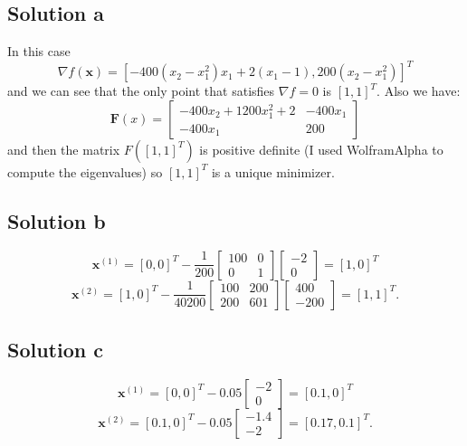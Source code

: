 \documentclass{article}
\newcommand{\bld}[1]{\boldsymbol{#1}}
\begin{document}
\subsection*{Solution a}
In this case
\[
	\nabla f(\bld{x})=[-400(x_2-x_1^2)x_1+2(x_1-1),200(x_2-x_1^2)]^T
\]
and we can see that the only point that satisfies $\nabla f=0$ is $[1,1]^T$.
Also we have:
\[
	\bld{F}(x)=\begin{bmatrix}
		-400x_2 + 1200x_1^2 + 2 & -400x_1 \\
		-400x_1 & 200
	\end{bmatrix}
\]
and then the matrix $F([1,1]^T)$ is positive definite (I used WolframAlpha to
compute the eigenvalues) so $[1,1]^T$ is a unique minimizer.
\subsection*{Solution b}
\[
	\bld{x}^{(1)}=[0,0]^T - \frac{1}{200}
	\begin{bmatrix}
		100 & 0 \\
		0 & 1
	\end{bmatrix}
	\begin{bmatrix}
		-2\\
		0
	\end{bmatrix}
	=
	[1,0]^T
\]
\[
	\bld{x}^{(2)}=[1,0]^T - \frac{1}{40200}
	\begin{bmatrix}
		100 & 200 \\
		200 & 601
	\end{bmatrix}
	\begin{bmatrix}
		400\\
		-200
	\end{bmatrix}
	=
	[1,1]^T.
\]
\subsection*{Solution c}
\[
	\bld{x}^{(1)}=[0,0]^T - 0.05
	\begin{bmatrix}
		-2\\
		0
	\end{bmatrix}
	=
	[0.1,0]^T
\]
\[
	\bld{x}^{(2)}=[0.1,0]^T -0.05
	\begin{bmatrix}
		-1.4\\
		-2
	\end{bmatrix}
	=
	[0.17,0.1]^T.
\]
\end{document}
